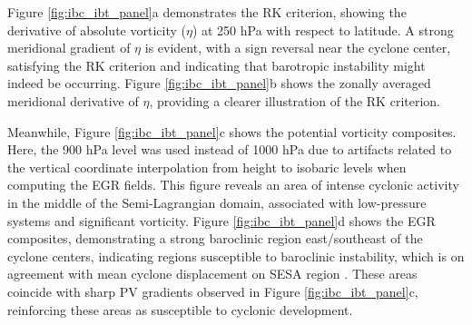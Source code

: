 Figure \ref{fig:ibc_ibt_panel}a demonstrates the RK criterion, showing the derivative of absolute vorticity ($\eta$) at 250 hPa with respect to latitude. A strong meridional gradient of $\eta$ is evident, with a sign reversal near the cyclone center, satisfying the RK criterion and indicating that barotropic instability might indeed be occurring. Figure \ref{fig:ibc_ibt_panel}b shows the zonally averaged meridional derivative of $\eta$, providing a clearer illustration of the RK criterion.

Meanwhile, Figure \ref{fig:ibc_ibt_panel}c shows the potential vorticity composites. Here, the 900 hPa level was used instead of 1000 hPa due to artifacts related to the vertical coordinate interpolation from height to isobaric levels when computing the EGR fields. This figure reveals an area of intense cyclonic activity in the middle of the Semi-Lagrangian domain, associated with low-pressure systems and significant vorticity. Figure \ref{fig:ibc_ibt_panel}d shows the EGR composites, demonstrating a strong baroclinic region east/southeast of the cyclone centers, indicating regions susceptible to baroclinic instability, which is on agreement with mean cyclone displacement on SESA region \citep{hoskins2005new,gramcianinov2019properties}. These areas coincide with sharp PV gradients observed in Figure \ref{fig:ibc_ibt_panel}c, reinforcing these areas as susceptible to cyclonic development.

